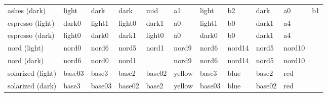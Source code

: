 \documentclass[lowerhead,12pt]{aesthetic}
\begin{document}
\begin{description}[font=\ttfamily]
\begin{landscape}
\begin{table}
\begin{tabular}{M{.1\linewidth}M{.1\linewidth}M{.05\linewidth}M{.1\linewidth}M{.1\linewidth}M{.1\linewidth}M{.1\linewidth}M{.1\linewidth}M{.1\linewidth}M{.1\linewidth}M{.05\linewidth}}
        ashes (dark) & \colorbox[HTML]{f3f3f5}{light} & {\color{white} \colorbox[HTML]{1c1e23}{dark}} & {\color{white} \colorbox[HTML]{1c1e23}{dark}} & {\color{white} \colorbox[HTML]{747a84}{mid}} & {\color{white} \colorbox[HTML]{ac95c7}{a1}} & \colorbox[HTML]{f3f3f5}{light} & {\color{white} \colorbox[HTML]{95acc7}{b2}} & {\color{white} \colorbox[HTML]{1c1e23}{dark}} & \colorbox[HTML]{c7ac95}{a0} & \colorbox[HTML]{acc795}{b1} \\
        es\-pre\-sso (light) & {\color{white} \colorbox[HTML]{323232}{dark0}} & \colorbox{white}{light1} & \colorbox[HTML]{eeeeec}{light0} & {\color{white} \colorbox[HTML]{353535}{dark1}} & {\color{white} \colorbox[HTML]{d25252}{a0}} & \colorbox{white}{light1} & \colorbox[HTML]{6c99bb}{b0} & {\color{white} \colorbox[HTML]{353535}{dark1}} & \colorbox[HTML]{c2e075}{a4} & \\
        es\-pre\-sso (dark) & \colorbox[HTML]{eeeeec}{light0} & {\color{white} \colorbox[HTML]{323232}{dark0}} & {\color{white} \colorbox[HTML]{353535}{dark1}} & \colorbox[HTML]{eeeeec}{light0} & {\color{white} \colorbox[HTML]{d25252}{a0}} & {\color{white} \colorbox[HTML]{323232}{dark0}} & \colorbox[HTML]{6c99bb}{b0} & {\color{white} \colorbox[HTML]{353535}{dark1}} & \colorbox[HTML]{c2e075}{a4} & \\
        nord (light) & {\color{white} \colorbox[HTML]{2E3440}{nord0}} & \colorbox[HTML]{ECEFF4}{nord6} & \colorbox[HTML]{E5E9F0}{nord5} & {\color{white} \colorbox[HTML]{3B4252}{nord1}} & \colorbox[HTML]{81A1C1}{nord9} & \colorbox[HTML]{eceff3}{nord6} & \colorbox[HTML]{A3BE8C}{nord14} & \colorbox[HTML]{e5e9f0}{nord5} & \colorbox[HTML]{5E81AC}{nord10} & \\
        nord (dark) & \colorbox[HTML]{ECEFF4}{nord6} & {\color{white} \colorbox[HTML]{2E3440}{nord0}} & {\color{white} \colorbox[HTML]{3B4252}{nord1}} & &  \colorbox[HTML]{81A1C1}{nord9} & \colorbox[HTML]{eceff3}{nord6} & \colorbox[HTML]{A3BE8C}{nord14} & \colorbox[HTML]{e5e9f0}{nord5} & \colorbox[HTML]{5E81AC}{nord10} & \\
        so\-l\-ar\-iz\-ed (light) & {\color{white} \colorbox[HTML]{002b36}{base03}} & \colorbox[HTML]{fdf6e3}{base3} & \colorbox[HTML]{eee8d5}{base2} & {\color{white} \colorbox[HTML]{073642}{base02}} & \colorbox[HTML]{b58900}{yellow} & \colorbox[HTML]{fdf6e2}{base3} & \colorbox[HTML]{268bd2}{blue} & \colorbox[HTML]{eee8d5}{base2} & \colorbox[HTML]{dc322f}{red} & \\
        so\-l\-ar\-iz\-ed (dark) & \colorbox[HTML]{fdf6e3}{base3} & {\color{white} \colorbox[HTML]{002b36}{base03}} & {\color{white} \colorbox[HTML]{073642}{base02}} & \colorbox[HTML]{eee8d5}{base2} & \colorbox[HTML]{b58900}{yellow} & {\color{white} \colorbox[HTML]{002b3b}{base03}} & \colorbox[HTML]{268bd2}{blue} & {\color{white} \colorbox[HTML]{073642}{base02}} & \colorbox[HTML]{dc322f}{red} & \\

\end{tabular}
\end{table}
\end{landscape}
\end{description}
\end{document}
